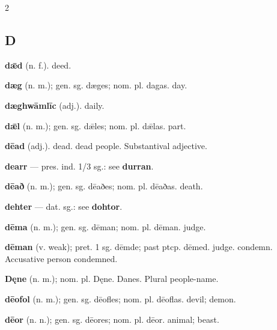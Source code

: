 \begin{multicols*}{2}
\subsection*{D}
\textbf{dǣd} (n. f.). deed.\par
\textbf{dæg} (n. m.); gen. sg. dæges; nom. pl. dagas. day.\par
\textbf{dæghwāmlīc} (adj.). daily.\par
\textbf{dǣl} (n. m.); gen. sg. dǣles; nom. pl. dǣlas. part.\par
\textbf{dēad} (adj.). dead. dead people. Substantival adjective.\par
\textbf{dearr} — pres. ind. 1/3 sg.: see \textbf{durran}.\par
\textbf{dēað} (n. m.); gen. sg. dēaðes; nom. pl. dēaðas. death.\par
\textbf{dehter} — dat. sg.: see \textbf{dohtor}.\par
\textbf{dēma} (n. m.); gen. sg. dēman; nom. pl. dēman. judge.\par
\textbf{dēman} (v. weak); pret. 1 sg. dēmde; past ptcp. dēmed. judge. condemn. Accusative person condemned.\par
\textbf{Dęne} (n. m.); nom. pl. Dęne. Danes. Plural people-name.\par
\textbf{dēofol} (n. m.); gen. sg. dēofles; nom. pl. dēoflas. devil; demon.\par
\textbf{dēor} (n. n.); gen. sg. dēores; nom. pl. dēor. animal; beast.\par

\end{multicols*}
